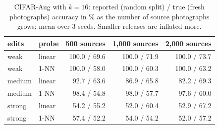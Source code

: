 \begin{table}[h]
\centering\footnotesize
\setlength{\tabcolsep}{4pt}
\caption{CIFAR-Aug with $k=16$: reported (random split) / true (fresh photographs) accuracy in \% as the number of source photographs grows; mean over 3 seeds. Smaller releases are inflated more.}
\label{tab:datasize}
\begin{tabular}{@{}llrrr@{}}
\toprule
edits & probe & 500 sources & 1,000 sources & 2,000 sources \\
\midrule
weak & linear & 100.0 / 69.6 & 100.0 / 71.9 & 100.0 / 73.7 \\
weak & 1-NN & 100.0 / 58.0 & 100.0 / 60.3 & 100.0 / 63.2 \\
medium & linear & 92.7 / 63.6 & 86.9 / 65.8 & 82.2 / 69.3 \\
medium & 1-NN & 98.4 / 54.8 & 98.0 / 57.7 & 97.6 / 60.0 \\
strong & linear & 54.2 / 55.2 & 52.0 / 60.4 & 52.9 / 67.2 \\
strong & 1-NN & 57.4 / 52.2 & 54.0 / 54.2 & 52.0 / 57.2 \\
\bottomrule
\end{tabular}
\end{table}
